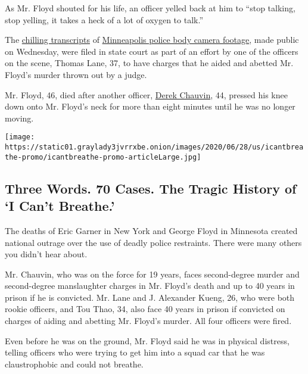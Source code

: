 As Mr. Floyd shouted for his life, an officer yelled back at him to
``stop talking, stop yelling, it takes a heck of a lot of oxygen to
talk.''

The
\href{https://int.graylady3jvrrxbe.onion/data/documenthelper/7070-exhibit-final07072020/4b81216735f2203a08cb/optimized/full.pdf\#page=1}{chilling
transcripts} of
\href{https://www.nytimes3xbfgragh.onion/2020/08/11/us/george-floyd-body-cam-full-video.html}{Minneapolis
police body camera footage}, made public on Wednesday, were filed in
state court as part of an effort by one of the officers on the scene,
Thomas Lane, 37, to have charges that he aided and abetted Mr. Floyd's
murder thrown out by a judge.

Mr. Floyd, 46, died after another officer,
\href{https://www.nytimes3xbfgragh.onion/2020/07/18/us/derek-chauvin-george-floyd.html}{Derek
Chauvin}, 44, pressed his knee down onto Mr. Floyd's neck for more than
eight minutes until he was no longer moving.

\href{https://www.nytimes3xbfgragh.onion/interactive/2020/06/28/us/i-cant-breathe-police-arrest.html}{}

\texttt{[image: https://static01.graylady3jvrrxbe.onion/images/2020/06/28/us/icantbreathe-promo/icantbreathe-promo-articleLarge.jpg]}

\hypertarget{three-words-70-cases-the-tragic-history-of-i-cant-breathe}{%
\subsection{Three Words. 70 Cases. The Tragic History of `I Can't
Breathe.'}\label{three-words-70-cases-the-tragic-history-of-i-cant-breathe}}

The deaths of Eric Garner in New York and George Floyd in Minnesota
created national outrage over the use of deadly police restraints. There
were many others you didn't hear about.

Mr. Chauvin, who was on the force for 19 years, faces second-degree
murder and second-degree manslaughter charges in Mr. Floyd's death and
up to 40 years in prison if he is convicted. Mr. Lane and J. Alexander
Kueng, 26, who were both rookie officers, and Tou Thao, 34, also face 40
years in prison if convicted on charges of aiding and abetting Mr.
Floyd's murder. All four officers were fired.

Even before he was on the ground, Mr. Floyd said he was in physical
distress, telling officers who were trying to get him into a squad car
that he was claustrophobic and could not breathe.

